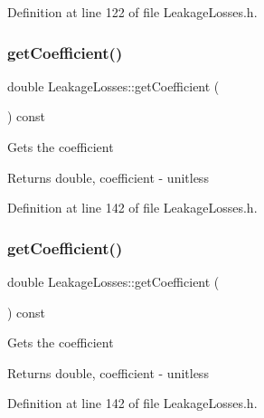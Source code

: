 Definition at line 122 of file Leakage\+Losses.\+h.

\mbox{\label{class_leakage_losses_a7f70af7175574e0c4447a322586ac01e}} 
\subsubsection{\texorpdfstring{get\+Coefficient()}{getCoefficient()}\hspace{0.1cm}{\footnotesize\ttfamily [1/3]}}
{\footnotesize\ttfamily double Leakage\+Losses\+::get\+Coefficient (\begin{DoxyParamCaption}{ }\end{DoxyParamCaption}) const\hspace{0.3cm}{\ttfamily [inline]}}

Gets the coefficient

\begin{DoxyReturn}{Returns}
double, coefficient -\/ unitless 
\end{DoxyReturn}


Definition at line 142 of file Leakage\+Losses.\+h.

\mbox{\label{class_leakage_losses_a7f70af7175574e0c4447a322586ac01e}} 
\subsubsection{\texorpdfstring{get\+Coefficient()}{getCoefficient()}\hspace{0.1cm}{\footnotesize\ttfamily [2/3]}}
{\footnotesize\ttfamily double Leakage\+Losses\+::get\+Coefficient (\begin{DoxyParamCaption}{ }\end{DoxyParamCaption}) const\hspace{0.3cm}{\ttfamily [inline]}}

Gets the coefficient

\begin{DoxyReturn}{Returns}
double, coefficient -\/ unitless 
\end{DoxyReturn}


Definition at line 142 of file Leakage\+Losses.\+h.

